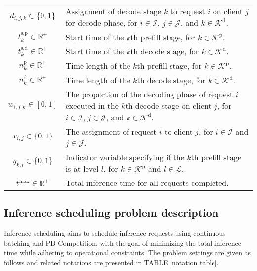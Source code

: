 \begin{table*}
\begin{tabular}{cl}
        $d_{i,j,k}\in \{0,1\}$ & Assignment of decode stage $k$ to request $i$ on client $j$ for decode phase, for $i\in \mathcal{I}$, $j\in \mathcal{J}$, and $k\in \mathcal{K}^\text{d}$.  \\
        $t^\text{s,p}_{k}\in \mathbb{R}^+$  & Start time of the $k$th prefill stage, for $k\in \mathcal{K}^\text{p}$.  \\
        $t^\text{s,d}_{k}\in \mathbb{R}^+$  & Start time of the $k$th decode stage, for $k\in \mathcal{K}^\text{d}$.\\
        $n^\text{p}_{k} \in \mathbb{R}^+$ & Time length of the $k$th  prefill stage, for $k\in \mathcal{K}^\text{p}$.  \\
        $n^\text{d}_{k} \in \mathbb{R}^+$ & Time length of the $k$th  decode stage, for $k\in \mathcal{K}^\text{d}$.  \\
        $w_{i,j,k}\in [0,1]$   & The proportion of the decoding phase of request $i$ executed in the $k$th decode stage on client $j$, for $i\in \mathcal{I}$, $j\in \mathcal{J}$, and $k\in \mathcal{K}^\text{d}$. \\
        $x_{i,j}\in \{0,1\}$ & The assignment of request $i$ to client $j$, for $i\in \mathcal{I}$ and $j\in \mathcal{J}$. \\
        $y_{k,l}\in \{0,1\}$    & Indicator variable specifying if the $k$th prefill stage is at level $l$, for $k\in \mathcal{K}^\text{p}$ and $l\in \mathcal{L}$.\\
        $t^\text{max} \in \mathbb{R}^+$ & Total inference time for all requests completed.\\
    \bottomrule
    \end{tabular}
    \label{notation table}
\end{table*}

\subsection{Inference scheduling problem description}
Inference scheduling aims to schedule inference requests using continuous batching and PD Competition, with the goal of minimizing the total inference time while adhering to operational constraints. The problem settings are given as follows and related notations are presented in TABLE \ref{notation table}.

